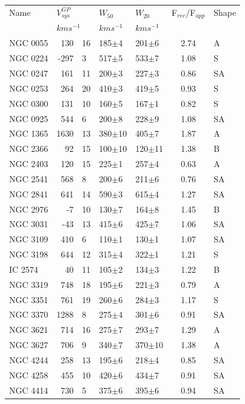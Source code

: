 \documentclass[usenatbib,useAMS]{mnras}
\begin{document}
\begin{table}
\begin{tabular}{lr@{$\pm$}lllcl}
\hline
Name & \multicolumn{2}{l}{$V_{sys}^{GP}$} & $W_{50}$ & $W_{20}$ & F$_{rec}$/F$_{app}$ & Shape\\
     & \multicolumn{2}{l}{$kms^{-1}$} &   $kms^{-1}$ &$kms^{-1}$ & & \\
% 
\hline
NGC 0055&130&16  &185$\pm$4  & 201$\pm$6  &2.74&A\\
NGC 0224&-297&3  &517$\pm$5  & 533$\pm$7  &1.08&S\\
NGC 0247&161&11  &200$\pm$3  & 227$\pm$3  &0.86&SA\\
NGC 0253&264&20  &410$\pm$3  & 419$\pm$5  &0.93&S\\
NGC 0300&131&10  &160$\pm$5  & 167$\pm$1  &0.82&S\\
NGC 0925&544&6   &200$\pm$8  & 228$\pm$9  &1.08&SA\\
NGC 1365&1630&13 &380$\pm$10 & 405$\pm$7  &1.87&A\\
NGC 2366&92&15   &100$\pm$10 & 120$\pm$11 &1.38&B\\
NGC 2403&120&15  &225$\pm$1  & 257$\pm$4  &0.63&A\\
NGC 2541&568&8   &200$\pm$6  & 211$\pm$6  &0.76&SA\\
NGC 2841&641&14  &590$\pm$3  & 615$\pm$4  &1.27&SA\\
NGC 2976&-7&10   &130$\pm$7  & 164$\pm$8  &1.45&B\\
NGC 3031&-43&13  &415$\pm$6  & 425$\pm$7  &1.06&SA\\
NGC 3109&410&6   &110$\pm$1  & 130$\pm$1  &1.07&SA\\
NGC 3198&644&12  &315$\pm$4  & 322$\pm$1  &1.21&S\\
IC 2574 &40&11   &105$\pm$2  & 134$\pm$3  &1.22&B\\
NGC 3319&748&18  &195$\pm$6  & 221$\pm$3  &0.79&A\\
NGC 3351&761&19  &260$\pm$6  & 284$\pm$3  &1.17&S\\
NGC 3370&1288&8  &275$\pm$4  & 301$\pm$6  &0.91&SA\\
NGC 3621&714&16  &275$\pm$7  & 293$\pm$7  &1.29&A\\
NGC 3627&706&9   &340$\pm$7  & 370$\pm$10 &1.38&A\\
NGC 4244&258&13  &195$\pm$6  & 218$\pm$4  &0.85&SA\\
NGC 4258&455&10  &420$\pm$6  & 434$\pm$7  &0.91&SA\\
NGC 4414&730&5   &375$\pm$6  & 395$\pm$6  &0.94&SA\\

\end{tabular}
\end{table}
\end{document}
